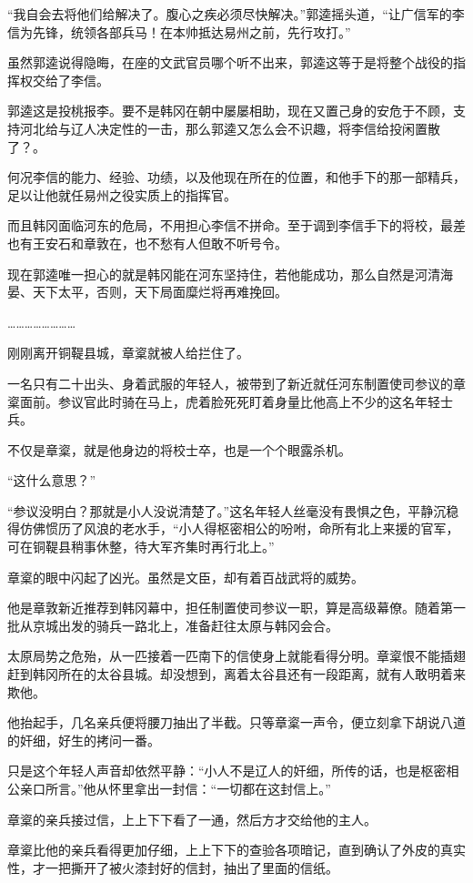 “我自会去将他们给解决了。腹心之疾必须尽快解决。”郭逵摇头道，“让广信军的李信为先锋，统领各部兵马！在本帅抵达易州之前，先行攻打。”

虽然郭逵说得隐晦，在座的文武官员哪个听不出来，郭逵这等于是将整个战役的指挥权交给了李信。

郭逵这是投桃报李。要不是韩冈在朝中屡屡相助，现在又置己身的安危于不顾，支持河北给与辽人决定性的一击，那么郭逵又怎么会不识趣，将李信给投闲置散了？。

何况李信的能力、经验、功绩，以及他现在所在的位置，和他手下的那一部精兵，足以让他就任易州之役实质上的指挥官。

而且韩冈面临河东的危局，不用担心李信不拼命。至于调到李信手下的将校，最差也有王安石和章敦在，也不愁有人但敢不听号令。

现在郭逵唯一担心的就是韩冈能在河东坚持住，若他能成功，那么自然是河清海晏、天下太平，否则，天下局面糜烂将再难挽回。

……………………

刚刚离开铜鞮县城，章楶就被人给拦住了。

一名只有二十出头、身着武服的年轻人，被带到了新近就任河东制置使司参议的章楶面前。参议官此时骑在马上，虎着脸死死盯着身量比他高上不少的这名年轻士兵。

不仅是章楶，就是他身边的将校士卒，也是一个个眼露杀机。

“这什么意思？”

“参议没明白？那就是小人没说清楚了。”这名年轻人丝毫没有畏惧之色，平静沉稳得仿佛惯历了风浪的老水手，“小人得枢密相公的吩咐，命所有北上来援的官军，可在铜鞮县稍事休整，待大军齐集时再行北上。”

章楶的眼中闪起了凶光。虽然是文臣，却有着百战武将的威势。

他是章敦新近推荐到韩冈幕中，担任制置使司参议一职，算是高级幕僚。随着第一批从京城出发的骑兵一路北上，准备赶往太原与韩冈会合。

太原局势之危殆，从一匹接着一匹南下的信使身上就能看得分明。章楶恨不能插翅赶到韩冈所在的太谷县城。却没想到，离着太谷县还有一段距离，就有人敢明着来欺他。

他抬起手，几名亲兵便将腰刀抽出了半截。只等章楶一声令，便立刻拿下胡说八道的奸细，好生的拷问一番。

只是这个年轻人声音却依然平静：“小人不是辽人的奸细，所传的话，也是枢密相公亲口所言。”他从怀里拿出一封信：“一切都在这封信上。”

章楶的亲兵接过信，上上下下看了一通，然后方才交给他的主人。

章楶比他的亲兵看得更加仔细，上上下下的查验各项暗记，直到确认了外皮的真实性，才一把撕开了被火漆封好的信封，抽出了里面的信纸。

